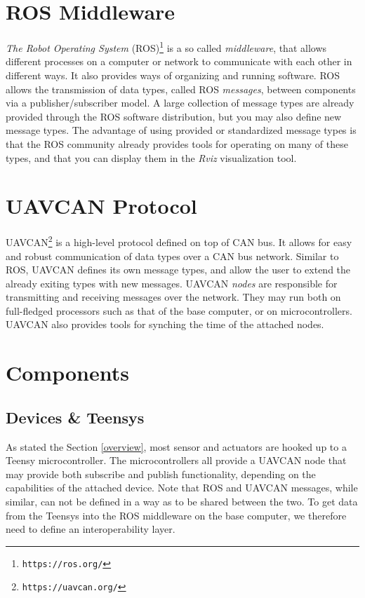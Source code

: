 \documentclass[9pt,technote]{IEEEtran} %
\begin{document}
\section{ROS Middleware}
\label{ros}

\textit{The Robot Operating System} (ROS)\footnote{\texttt{https://ros.org/}} is a so called \textit{middleware}, that allows different processes on
a computer or network to communicate with each other in different ways.
It also provides ways of organizing and running software. ROS allows the transmission of data types,
called ROS \textit{messages}, between components via a publisher/subscriber model.
A large collection of message types are already
provided through the ROS software distribution, but you may also define new message types.
The advantage of using provided or standardized message types is that the ROS community
already provides tools for operating on many of these types,
and that you can display them in the \textit{Rviz} visualization tool.

\section{UAVCAN Protocol}
\label{uavcan}

UAVCAN\footnote{\texttt{https://uavcan.org/}} is a high-level protocol defined on top of CAN bus. It allows for easy and robust
communication of data types over a CAN bus network. Similar to ROS, UAVCAN defines its
own message types, and allow the user to extend the already exiting types with new messages.
UAVCAN \textit{nodes} are responsible for transmitting and receiving messages over the network.
They may run both on full-fledged processors such as that of the base computer, or on microcontrollers.
UAVCAN also provides tools for synching the time of the attached nodes.

\section{Components}
\label{components}

\subsection{Devices \& Teensys}

As stated the Section \ref{overview}, most sensor and actuators are hooked up to a Teensy microcontroller.
The microcontrollers all provide a UAVCAN node that may provide both subscribe and publish
functionality, depending on the capabilities of the attached device.
Note that ROS and UAVCAN messages, while similar, can not be defined in a way
as to be shared between the two. To get data from the Teensys into the ROS middleware
on the base computer, we therefore need to define an interoperability layer.
\end{document}
